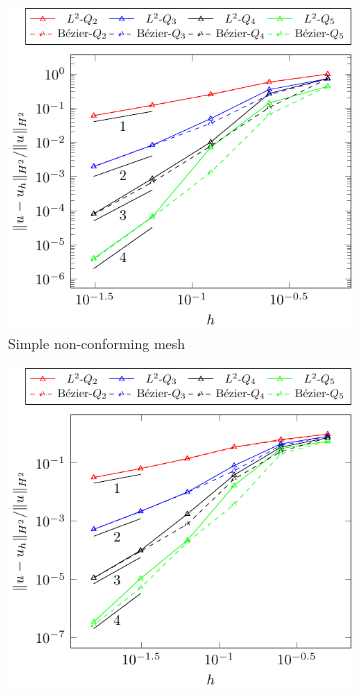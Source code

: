 \documentclass[preprint,12pt]{elsarticle}
\theoremstyle{remark}
\begin{document}
\begin{figure}[hbt]
    \captionsetup[subfigure]{labelformat=empty, font = footnotesize, justification=centering}
    \centering
    \begin{subfigure}[b]{0.48\textwidth}
        \includegraphics[width=\textwidth]{two_patch_biharmonic_basic_H2}
        \caption{Simple non-conforming mesh}
        \vspace*{3mm}
    \end{subfigure}
    \begin{subfigure}[b]{0.48\textwidth}
        \includegraphics[width=\textwidth]{two_patch_biharmonic_distorted_H2}

\end{subfigure}
\end{figure}
\end{document}
